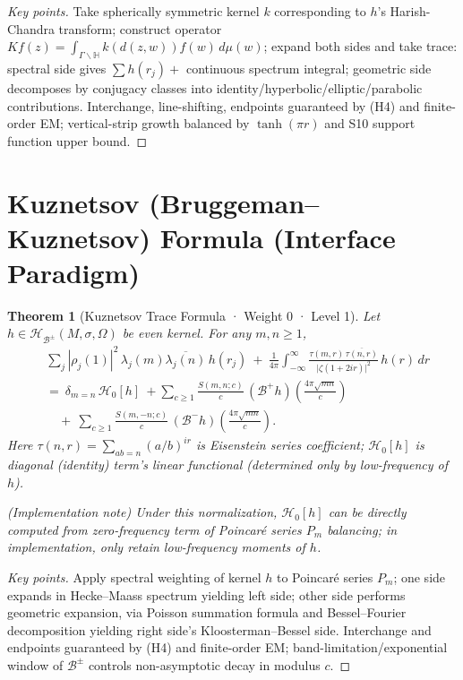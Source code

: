 \documentclass[11pt,a4paper]{article}
\newtheorem{theorem}{Theorem}[section]
\theoremstyle{remark}
\begin{document}
\begin{proof}[Key points]
Take spherically symmetric kernel $k$ corresponding to $h$'s Harish-Chandra transform; construct operator $Kf(z)=\int_{\Gamma\backslash\mathbb{H}}k(d(z,w))f(w)\,d\mu(w)$; expand both sides and take trace: spectral side gives $\sum h(r_j)+$ continuous spectrum integral; geometric side decomposes by conjugacy classes into identity/hyperbolic/elliptic/parabolic contributions. Interchange, line-shifting, endpoints guaranteed by (H4) and finite-order EM; vertical-strip growth balanced by $\tanh(\pi r)$ and S10 support function upper bound.
\end{proof}

\section{Kuznetsov (Bruggeman--Kuznetsov) Formula (Interface Paradigm)}

\begin{theorem}[Kuznetsov Trace Formula · Weight 0 · Level 1]\label{thm:kuznetsov}
Let $h\in \mathscr{H}_{\mathcal{B}^\pm}(M,\sigma,\Omega)$ be even kernel. For any $m,n\ge1$,
\begin{equation}
\boxed{
\begin{aligned}
&\sum_j |\rho_j(1)|^2\,\lambda_j(m)\overline{\lambda_j(n)}\,h(r_j)\ +\ \frac{1}{4\pi}\int_{-\infty}^{\infty} \frac{\tau(m,r)\,\overline{\tau(n,r)}}{\bigl|\zeta(1+2ir)\bigr|^{2}}\,h(r)\,dr\\
&=\ \delta_{m=n}\,\mathcal{H}_0[h]\ +
\sum_{c\ge1}\frac{S(m,n;c)}{c}\,(\mathcal{B}^{+} h)\left(\tfrac{4\pi \sqrt{m n}}{c}\right)\\
&\quad+\ \sum_{c\ge1}\frac{S(m,-n;c)}{c}\,(\mathcal{B}^{-} h)\left(\tfrac{4\pi \sqrt{m n}}{c}\right).
\end{aligned}}
\end{equation}
Here $\tau(n,r)=\sum_{ab=n}(a/b)^{ir}$ is Eisenstein series coefficient; $\mathcal{H}_0[h]$ is diagonal (identity) term's linear functional (determined only by low-frequency of $h$).

(Implementation note) Under this normalization, $\mathcal{H}_0[h]$ can be directly computed from zero-frequency term of Poincaré series $P_m$ balancing; in implementation, only retain low-frequency moments of $h$.
\end{theorem}

\begin{proof}[Key points]
Apply spectral weighting of kernel $h$ to Poincaré series $P_m$; one side expands in Hecke--Maass spectrum yielding left side; other side performs geometric expansion, via Poisson summation formula and Bessel--Fourier decomposition yielding right side's Kloosterman--Bessel side. Interchange and endpoints guaranteed by (H4) and finite-order EM; band-limitation/exponential window of $\mathcal{B}^\pm$ controls non-asymptotic decay in modulus $c$.
\end{proof}
\end{document}
